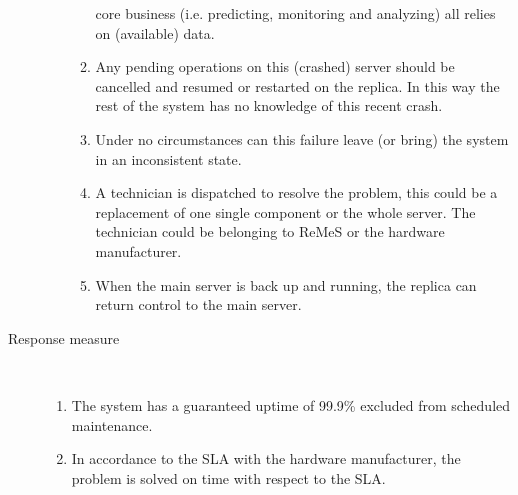 \begin{description}
\begin{enumerate}
\begin{enumerate}
	   core business (i.e. predicting, monitoring and analyzing) all relies on
	   (available) data.
	   \item Any pending operations on this (crashed) server should be cancelled
	   and resumed or restarted on the replica. In this way the rest of the system
	   has no knowledge of this recent crash.
	   \item Under no circumstances can this failure leave (or bring) the system
	    in an inconsistent state.
	    \item A technician is dispatched to resolve the problem, this could be a
	    replacement of one single component or the whole server. The technician
	    could be belonging to ReMeS or the hardware manufacturer.
	    \item When the main server is back up and running, the replica can return
	    control to the main server.
	  \end{enumerate}
	\end{enumerate}
	\item[Response measure] \
	\begin{enumerate}
	  \item The system has a guaranteed uptime of 99.9\% excluded from scheduled
	  maintenance.
	  \item In accordance to the SLA with the hardware manufacturer, the problem is
	  solved on time with respect to the SLA.
	\end{enumerate}
\end{description}